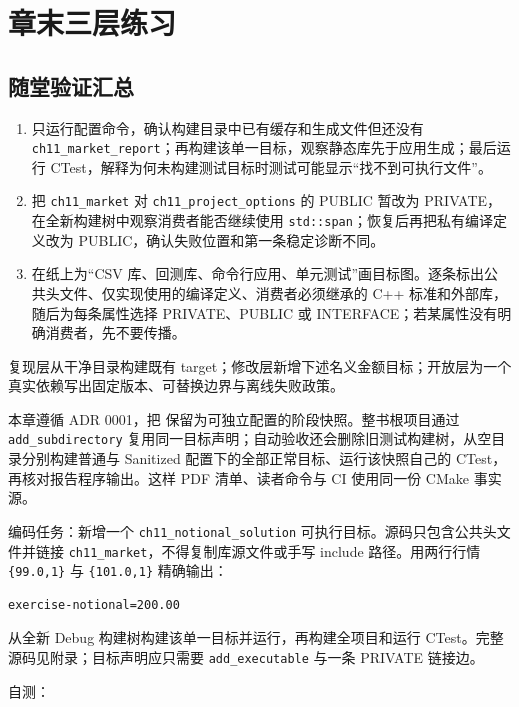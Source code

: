 \section{章末三层练习}

\subsection*{随堂验证汇总}

\begin{enumerate}
  \item 只运行配置命令，确认构建目录中已有缓存和生成文件但还没有 \texttt{ch11\_market\_report}；再构建该单一目标，观察静态库先于应用生成；最后运行 CTest，解释为何未构建测试目标时测试可能显示“找不到可执行文件”。
  \item 把 \texttt{ch11\_market} 对 \texttt{ch11\_project\_options} 的 PUBLIC 暂改为 PRIVATE，在全新构建树中观察消费者能否继续使用 \texttt{std::span}；恢复后再把私有编译定义改为 PUBLIC，确认失败位置和第一条稳定诊断不同。
  \item 在纸上为“CSV 库、回测库、命令行应用、单元测试”画目标图。逐条标出公共头文件、仅实现使用的编译定义、消费者必须继承的 C++ 标准和外部库，随后为每条属性选择 PRIVATE、PUBLIC 或 INTERFACE；若某属性没有明确消费者，先不要传播。
\end{enumerate}

复现层从干净目录构建既有 target；修改层新增下述名义金额目标；开放层为一个真实依赖写出固定版本、可替换边界与离线失败政策。

本章遵循 ADR 0001，把  保留为可独立配置的阶段快照。整书根项目通过 \texttt{add\_subdirectory} 复用同一目标声明；自动验收还会删除旧测试构建树，从空目录分别构建普通与 Sanitized 配置下的全部正常目标、运行该快照自己的 CTest，再核对报告程序输出。这样 PDF 清单、读者命令与 CI 使用同一份 CMake 事实源。

编码任务：新增一个 \texttt{ch11\_notional\_solution} 可执行目标。源码只包含公共头文件并链接 \texttt{ch11\_market}，不得复制库源文件或手写 include 路径。用两行行情 \texttt{\{99.0,1\}} 与 \texttt{\{101.0,1\}} 精确输出：

\begin{lstlisting}[numbers=none]
exercise-notional=200.00
\end{lstlisting}

从全新 Debug 构建树构建该单一目标并运行，再构建全项目和运行 CTest。完整源码见附录；目标声明应只需要 \texttt{add\_executable} 与一条 PRIVATE 链接边。

自测：

